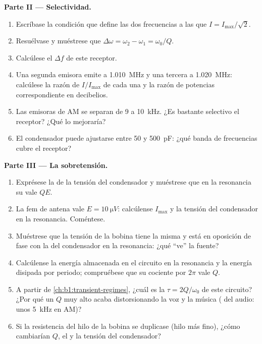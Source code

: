 \begin{problem}
\medskip
\noindent\textbf{Parte II --- Selectividad.}
\begin{enumerate}[resume]
  \item Escríbase la condición que define las dos frecuencias a las que
        $I = I_{\max}/\sqrt2$.
  \item Resuélvase y muéstrese que $\Delta\omega = \omega_2 - \omega_1 =
        \omega_0/Q$.
  \item Calcúlese el  $\Delta f$ de este receptor.
  \item Una segunda emisora emite a \qty{1.010}{MHz} y una tercera a
        \qty{1.020}{MHz}: calcúlese la razón de  $I/I_{\max}$ de
        cada una y la razón de potencias correspondiente en decibelios.
  \item Las emisoras de AM se separan de \qty{9}{} a \qty{10}{kHz}. ¿Es
        bastante selectivo el receptor? ¿Qué lo mejoraría?
  \item El condensador puede ajustarse entre \qty{50}{} y \qty{500}{pF}:
        ¿qué banda de frecuencias cubre el receptor?
\end{enumerate}

\medskip
\noindent\textbf{Parte III --- La sobretensión.}
\begin{enumerate}[resume]
  \item Exprésese la  de la tensión del condensador y
        muéstrese que en la resonancia su  vale $QE$.
  \item La fem de antena vale $E = \qty{10}{\micro V}$: calcúlense
        $I_{\max}$ y la tensión del condensador en la resonancia.
        Coméntese.
  \item Muéstrese que la tensión de la bobina tiene la misma  y
        está en oposición de fase con la del condensador en la resonancia:
        ¿qué ``ve'' la fuente?
  \item Calcúlense la energía almacenada en el circuito en la resonancia y
        la energía disipada por periodo; compruébese que su cociente por
        $2\pi$ vale $Q$.
  \item A partir de \cref{ch:b1:transient-regimes}, ¿cuál es la  $\tau = 2Q/\omega_0$ de este circuito? ¿Por qué un $Q$
        muy alto acaba distorsionando la voz y la música (
        del audio: unos \qty{5}{kHz} en AM)?
  \item Si la resistencia del hilo de la bobina se duplicase (hilo más
        fino), ¿cómo cambiarían $Q$, el  y la tensión del
        condensador?
\end{enumerate}


\end{problem}
